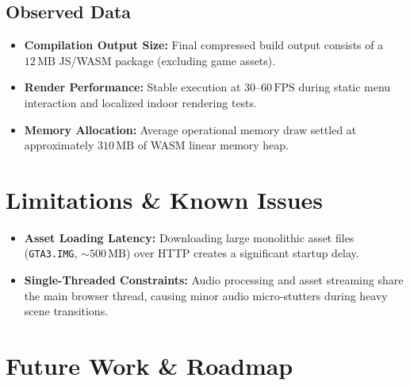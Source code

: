 \documentclass[12pt,a4paper]{article}
\begin{document}
\subsection{Observed Data}
\begin{itemize}
    \item \textbf{Compilation Output Size:} Final compressed build output consists of a $12\,\text{MB}$ JS/WASM package (excluding game assets).
    \item \textbf{Render Performance:} Stable execution at $30\text{--}60\,\text{FPS}$ during static menu interaction and localized indoor rendering tests.
    \item \textbf{Memory Allocation:} Average operational memory draw settled at approximately $310\,\text{MB}$ of WASM linear memory heap.
\end{itemize}

\section{Limitations \& Known Issues}

\begin{itemize}
    \item \textbf{Asset Loading Latency:} Downloading large monolithic asset files (\texttt{GTA3.IMG}, $\sim 500\,\text{MB}$) over HTTP creates a significant startup delay.
    \item \textbf{Single-Threaded Constraints:} Audio processing and asset streaming share the main browser thread, causing minor audio micro-stutters during heavy scene transitions.
\end{itemize}

\section{Future Work \& Roadmap}
\end{document}
